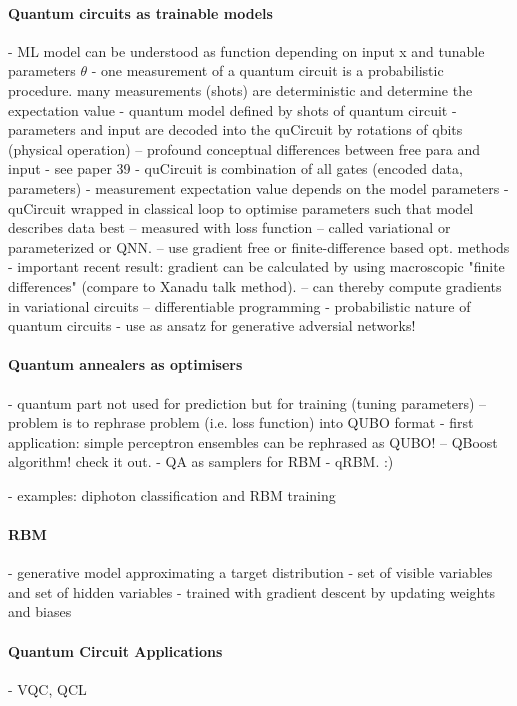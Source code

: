 \paragraph{Quantum circuits as trainable models}
- ML model can be understood as function depending on input x and tunable
  parameters $\theta$
- one measurement of a quantum circuit is a probabilistic procedure. many
  measurements (shots) are deterministic and determine the expectation value
- quantum model defined by shots of quantum circuit
- parameters and input are decoded into the quCircuit by rotations of qbits
  (physical operation)
-- profound conceptual differences between free para and input - see paper 39
- quCircuit is combination of all gates (encoded data, parameters) - measurement
  expectation value depends on the model parameters
- quCircuit wrapped in classical loop to optimise parameters such that model
  describes data best
-- measured with loss function
-- called variational or parameterized or QNN.
-- use gradient free or finite-difference based opt. methods
- important recent result: gradient can be calculated by using macroscopic
  "finite differences" (compare to Xanadu talk method). 
-- can thereby compute gradients in variational circuits
-- differentiable programming
- probabilistic nature of quantum circuits - use as ansatz for generative
  adversial networks!

\paragraph{Quantum annealers as optimisers}
- quantum part not used for prediction but for training (tuning parameters)
-- problem is to rephrase problem (i.e. loss function) into QUBO format
- first application: simple perceptron ensembles can be rephrased as QUBO!
-- QBoost algorithm! check it out.
- QA as samplers for RBM - qRBM. :)

- examples: diphoton classification and RBM training

\paragraph{RBM}
- generative model approximating a target distribution
- set of visible variables and set of hidden variables
- trained with gradient descent by updating weights and biases


\paragraph{Quantum Circuit Applications}
- VQC, QCL


